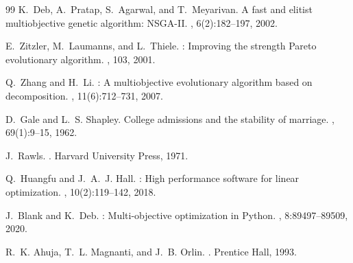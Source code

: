 \documentclass[11pt,a4paper,oneside]{report}
\begin{document}
\newpage
\begin{thebibliography}{99}
K.~Deb, A.~Pratap, S.~Agarwal, and T.~Meyarivan.
\newblock A fast and elitist multiobjective genetic algorithm: {NSGA-II}.
, 6(2):182--197, 2002.

E.~Zitzler, M.~Laumanns, and L.~Thiele.
: Improving the strength {Pareto} evolutionary algorithm.
, 103, 2001.

Q.~Zhang and H.~Li.
: A multiobjective evolutionary algorithm based on decomposition.
, 11(6):712--731, 2007.

D.~Gale and L.~S. Shapley.
\newblock College admissions and the stability of marriage.
, 69(1):9--15, 1962.

J.~Rawls.
.
\newblock Harvard University Press, 1971.

Q.~Huangfu and J.~A.~J. Hall.
: High performance software for linear optimization.
, 10(2):119--142, 2018.

J.~Blank and K.~Deb.
: Multi-objective optimization in {Python}.
, 8:89497--89509, 2020.

R.~K. Ahuja, T.~L. Magnanti, and J.~B. Orlin.
.
\newblock Prentice Hall, 1993.
\end{thebibliography}

\end{document}
